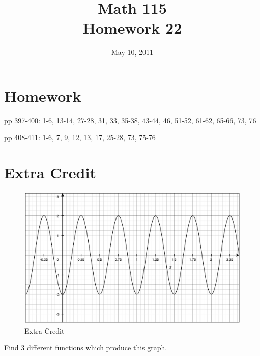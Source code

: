 \documentclass[fleqn,addpoints]{exam}
\title{Math 115 \\ Homework 22}
\date{May 10, 2011}
\begin{document}
\maketitle



\section{Homework}
\begin{itemize*}
  \item pp 397-400: 1-6, 13-14, 27-28, 31, 33, 35-38, 43-44, 46, 51-52, 61-62, 65-66, 73, 76
  \item pp 408-411: 1-6, 7, 9, 12, 13, 17, 25-28, 73, 75-76 
\end{itemize*}


\section{Extra Credit}
\begin{figure}[H]
  \centering
  \includegraphics[scale=.4]{extra_credit.eps}
  \caption*{Extra Credit}
\end{figure}

Find 3 different functions which produce this graph.
\end{document}
